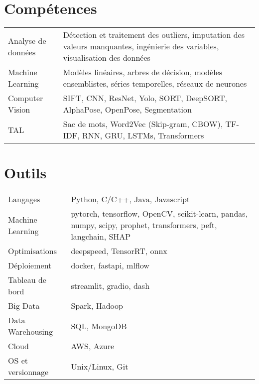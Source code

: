 \documentclass[a4paper,12pt]{article}
\begin{document}
\section{Compétences}
\begin{tabularx}{\linewidth}{@{}l X@{}}
Analyse de données & \normalsize{Détection et traitement des outliers, imputation des valeurs manquantes, ingénierie des variables, visualisation des données}\\
Machine Learning & \normalsize{Modèles linéaires, arbres de décision, modèles ensemblistes, séries temporelles, réseaux de neurones}\\
Computer Vision & \normalsize{SIFT, CNN, ResNet, Yolo, SORT, DeepSORT, AlphaPose, OpenPose, Segmentation}\\
TAL & \normalsize{Sac de mots, Word2Vec (Skip-gram, CBOW), TF-IDF, RNN, GRU, LSTMs, Transformers}\\
\end{tabularx}

\section{Outils}
\begin{tabularx}{\linewidth}{@{}l X@{}}
Langages & \normalsize{Python, C/C++, Java, Javascript}\\
Machine Learning & \normalsize{pytorch, tensorflow, OpenCV, scikit-learn, pandas, 
numpy, scipy, prophet, transformers, peft, langchain, SHAP}\\
Optimisations & \normalsize{deepspeed, TensorRT, onnx}\\
Déploiement & \normalsize{docker, fastapi, mlflow}\\
Tableau de bord & \normalsize{streamlit, gradio, dash}\\
Big Data & \normalsize{Spark, Hadoop}\\
Data Warehousing & \normalsize{SQL, MongoDB}\\
Cloud & \normalsize{AWS, Azure}\\
OS et versionnage & \normalsize{Unix/Linux, Git}\\
\end{tabularx}

\end{document}
